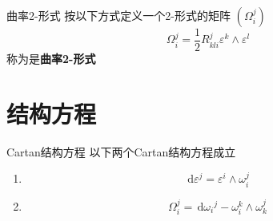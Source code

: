 \documentclass[../../main.tex]{subfiles}
\begin{document}
\begin{definition}{曲率2-形式}
    按以下方式定义一个2-形式的矩阵 \(  \left(  \Omega _{i}^{j} \right)   \)\[
     \Omega _{i}^{j}= \frac{1}{2}R_{kli}^{j} \varepsilon ^{k}\wedge  \varepsilon ^{l}
    \] 称为是\textbf{曲率2-形式}
\end{definition}

\section{结构方程}

\begin{theorem}{Cartan结构方程}
    以下两个Cartan结构方程成立
    \begin{enumerate}
        \item  \[
        \,\mathrm{d}  \varepsilon ^{j}=  \varepsilon ^{i}\wedge  \omega _{i}^{j}
        \]
        \item  \[
   \Omega _{i}^{j}= \,\mathrm{d} { \omega _{i}}^{j} - \omega _{i}^{k}\wedge  \omega _{k}^{j}
  \]  
    \end{enumerate}
    
\end{theorem}
\end{document}
